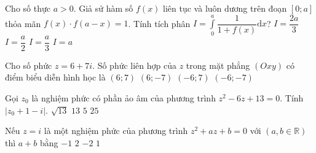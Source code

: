 \begin{ex}%
	Cho số thực $a>0$. Giả sử hàm số $f(x)$ liên tục và luôn dương trên đoạn $\left[0;a\right]$ thỏa mãn $f(x)\cdot f(a-x)=1$. Tính tích phân $\displaystyle I=\int\limits_0^a{\dfrac{1}{1+f(x)}}\mathrm{d}x$?
	\choice
	{$I=\dfrac{2a}{3}$}
	{\True $I=\dfrac{a}{2}$}
	{$I=\dfrac{a}{3}$}
	{$I=a$}
\end{ex}
\begin{ex}%
	Cho số phức $z=6+7i$. Số phức liên hợp của $z$ trong mặt phẳng $(Oxy)$ có điểm biểu diễn hình học là
	\choice
	{$\left(6;7\right)$}
	{\True $\left(6;-7\right)$}
	{$\left(-6;7\right)$}
	{$\left(-6;-7\right)$}
\end{ex}
\begin{ex}%
	Gọi $z_0$ là nghiệm phức có phần ảo âm của phương trình $z^2-6 z+13=0$. Tính $\left| z_0+1-i\right|$.
	\choice
	{$\sqrt{13}$}
	{$13$}
	{\True $5$}
	{$25$}
\end{ex}
\begin{ex}%
	Nếu $z=i$ là một nghiệm phức của phương trình $z^2+az+b=0$ với $(a,b\in \mathbb{R})$ thì $a+b$ bằng
	\choice
	{$-1$}
	{$2$}
	{$-2$}
	{\True $1$}
\end{ex}
